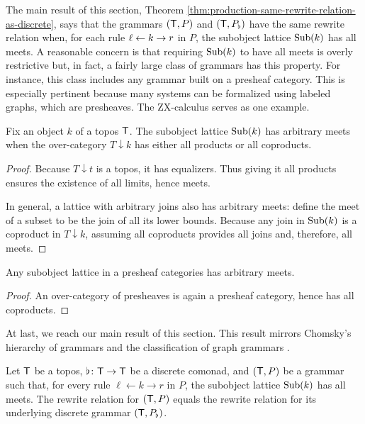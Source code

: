 \documentclass{amsart}
\begin{document}
The main result of this section, Theorem
\ref{thm:production-same-rewrite-relation-as-discrete},
says that the grammars $ ( \mathsf{T},P ) $ and
$ ( \mathsf{T},P_\flat ) $ have the same rewrite relation
when, for each rule $ \ell \leftarrow k \to r $ in $ P $,
the subobject lattice $ \operatorname{Sub}(k) $ has all meets. A
reasonable concern is that requiring $ \operatorname{Sub}(k) $
to have all meets is overly restrictive but, in
fact, a fairly large class of grammars has this
property. For instance, this class includes any grammar
built on a presheaf category.  This is especially
pertinent because many systems can be formalized
using labeled graphs, which are presheaves. The
ZX-calculus \cite{ZX} serves as one example.

\begin{proposition}
  \label{thm:subob-arbitrary-meets}
  Fix an object $k$ of a topos $ \mathsf{T} $.  The subobject
  lattice $ \operatorname{Sub} (k) $ has arbitrary meets when the
  over-category $ T \downarrow k $ has either all products or all coproducts.
\end{proposition}

\begin{proof}
  Because $ T \downarrow t $ is a topos, it has
  equalizers. Thus giving it all products ensures the
  existence of all limits, hence meets.

  In general, a lattice with arbitrary joins also has
  arbitrary meets: define the meet of a subset to be
  the join of all its lower bounds. Because any join in
  $ \operatorname{Sub} (k) $ is a coproduct in $ T \downarrow k $,
  assuming all coproducts provides all joins and, therefore,
  all meets.  
\end{proof}

\begin{corollary}
  Any subobject lattice in a presheaf categories has
  arbitrary meets.  
\end{corollary}

\begin{proof}
  An over-category of presheaves is again a presheaf
  category, hence has all coproducts.  
\end{proof}

At last, we reach our main result of this section.
This result mirrors Chomsky's hierarchy of
grammars \cite{Chomsky} and the classification of
graph grammars \cite[Prop.~3.3]{Ehrig_GraphGram}.

\begin{theorem}
  \label{thm:production-same-rewrite-relation-as-discrete}  
  Let $ \mathsf{T} $ be a topos, $ \flat \colon \mathsf{T} \to \mathsf{T} $
  be a discrete comonad, and $ ( \mathsf{T} , P ) $ be a
  grammar such that, for every rule
  $ \ell \gets k \to r $ in $ P $, the subobject
  lattice $ \operatorname{Sub} (k) $ has all meets. The rewrite
  relation for $ ( \mathsf{T} , P ) $ equals the rewrite
  relation for its underlying discrete grammar
  $ ( \mathsf{T},P_\flat ) $.
\end{theorem}
\end{document}
